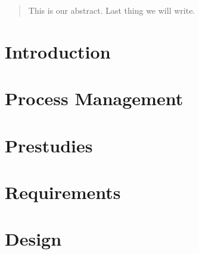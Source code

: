 \documentclass[11pt,a4paper,twoside]{report}
\begin{document}



\begin{abstract}
This is our abstract. Last thing we will write.
\end{abstract}

\cleardoublepage
\tableofcontents
\cleardoublepage

\listoffigures
\cleardoublepage

\listoftables



\cleardoublepage
\chapter{Introduction}\label{ch:introduction}


\cleardoublepage
\chapter{Process Management}\label{ch:management}


\cleardoublepage
\chapter{Prestudies}\label{ch:prestudies}


\cleardoublepage
\chapter{Requirements}\label{ch:requirements}


\cleardoublepage
\chapter{Design}\label{ch:architecture}

\end{document}

